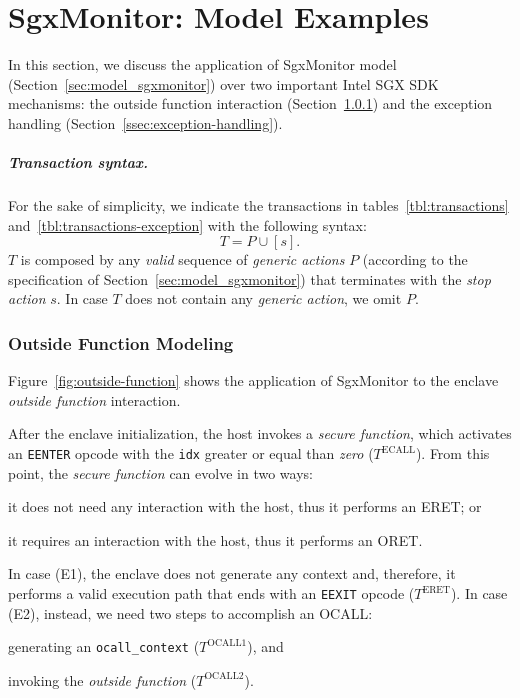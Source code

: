\chapter{SgxMonitor: Model Examples}
\label{sec:model-examples_sgxmonitor}

In this section, we discuss the application of SgxMonitor model 
(Section~\ref{sec:model_sgxmonitor}) over two important Intel SGX SDK 
mechanisms:
the outside function interaction (Section~\ref{ssec:ocall-example}) and the 
exception handling (Section~\ref{ssec:exception-handling}).

\paragraph{Transaction syntax.}
For the sake of simplicity, we indicate the transactions in 
tables~\ref{tbl:transactions} and~\ref{tbl:transactions-exception} with the 
following syntax:
$$
T = P \cup [s].
$$
$T$ is composed by any \emph{valid} sequence of \emph{generic actions} $P$ 
(according to the specification of Section~\ref{sec:model_sgxmonitor}) that 
terminates with the \emph{stop action} $s$.
In case $T$ does not contain any \emph{generic action}, we omit $P$.

\subsection{Outside Function Modeling}
\label{ssec:ocall-example}

Figure~\ref{fig:outside-function} shows the application of SgxMonitor to the 
enclave \emph{outside function} interaction.

After the enclave initialization, the host invokes a \emph{secure 
function}, which activates an \texttt{EENTER} opcode with the 
\texttt{idx} greater or equal than \emph{zero} (\ie $T^\text{ECALL}$).
From this point, the \emph{secure function} can evolve in two ways:
\begin{enumerate*}[label=(E\arabic*)]
	\item it does not need any interaction with the host, thus it performs an 
	ERET; or 
	\item it requires an interaction with the host, thus it performs an ORET.
\end{enumerate*}
In case (E1), the enclave does not generate any context and, therefore,
it performs a valid execution path that ends with an 
\texttt{EEXIT} opcode (\ie $T^{\text{ERET}}$).
In case (E2), instead, we need two steps to accomplish an OCALL:
\begin{enumerate*}[label=(\roman*)]
	\item generating an \texttt{ocall\_context} (\ie $T^\text{OCALL1}$), and
	\item invoking the \emph{outside function} (\ie $T^\text{OCALL2}$).
\end{enumerate*}

